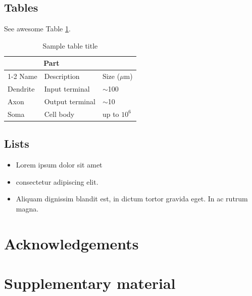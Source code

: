 \documentclass[twocolumn, switch]{article} %
\begin{document}
\subsection{Tables}
\lipsum[12]
See awesome Table \ref{tab:table}.

\begin{table}[H]
 \caption{Sample table title}
  \centering
  \begin{tabular}{lll}
    \toprule
    \multicolumn{2}{c}{Part}                   \\
    \cmidrule(r){1-2}
    Name     & Description     & Size ($\mu$m) \\
    \midrule
    Dendrite & Input terminal  & $\sim$100     \\
    Axon     & Output terminal & $\sim$10      \\
    Soma     & Cell body       & up to $10^6$  \\
    \bottomrule
  \end{tabular}
  \label{tab:table}
\end{table}

\subsection{Lists}
\begin{itemize}
\item Lorem ipsum dolor sit amet
\item consectetur adipiscing elit.
\item Aliquam dignissim blandit est, in dictum tortor gravida eget. In ac rutrum magna.
\end{itemize}

\lipsum[6]

\footnotesize
\section*{Acknowledgements}
\lipsum[101]

\normalsize




\footnotesize
\section*{Supplementary material}
\lipsum[101]

\lipsum[102]

\lipsum[103]

\end{document}
